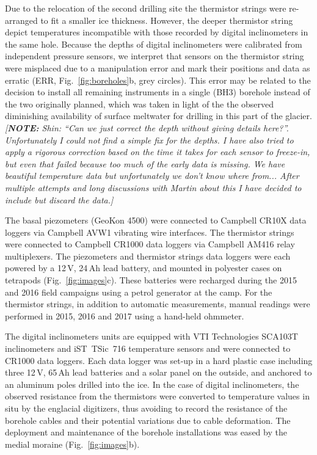 \documentclass[utf8]{article}
\newcommand{\note}[1]{\textcolor{c0}{\emph{[\textbf{NOTE:} #1]}}}
\begin{document}
    Due to the relocation of the second drilling site the thermistor strings
    were re-arranged to fit a smaller ice thickness. However, the deeper
    thermistor string depict temperatures incompatible with those recorded by
    digital inclinometers in the same hole. Because the depths of digital
    inclinometers were calibrated from independent pressure sensors, we
    interpret that sensors on the thermistor string were misplaced due to a
    manipulation error and mark their positions and data as erratic (ERR,
    Fig.~\ref{fig:boreholes}b, grey circles). This error may be related to the
    decision to install all remaining instruments in a single (BH3) borehole
    instead of the two originally planned, which was taken in light of the
    the observed diminishing availability of surface meltwater for drilling in
    this part of the glacier.
    \note{Shin: ``Can we just correct the depth without giving details here?''.
          Unfortunately I could not find a simple fix for the depths. I have
          also tried to apply a rigorous correction based on the time it takes
          for each sensor to freeze-in, but even that failed because too much
          of the early data is missing. We have beautiful temperature data but
          unfortunately we don't know where from... After multiple attempts
          and long discussions with Martin about this I have decided to include
          but discard the data.}

    The basal piezometers (GeoKon 4500) were connected to Campbell CR10X data
    loggers via Campbell AVW1 vibrating wire interfaces. The thermistor strings
    \citep[NTC~Fenwal 135-103FAG-J01,][]{Ryser.2014} were connected to Campbell
    CR1000 data loggers via Campbell AM416 relay multiplexers. The piezometers
    and thermistor strings data loggers were each powered by a 12\,V, 24\,Ah
    lead battery, and mounted in polyester cases on tetrapods
    (Fig.~\ref{fig:images}c). These batteries were recharged during the 2015
    and 2016 field campaigns using
    a petrol generator at the camp. For the thermistor strings, in addition to
    automatic measurements, manual readings were performed in 2015, 2016 and
    2017 using a hand-held ohmmeter.

    The digital inclinometers units \citep[DIBOSS,][]{Ryser.2014,
    Ryser.etal.2014, Ryser.etal.2014a} are equipped with VTI Technologies
    SCA103T inclinometers and iST~TSic~716 temperature sensors and
    were connected to CR1000 data loggers. Each data logger
    was set-up in a hard plastic case including three 12\,V, 65\,Ah lead
    batteries and a solar panel on the outside, and anchored to an aluminum
    poles drilled into the ice.
    In the case of digital inclinometers, the observed resistance from the
    thermistors were converted to temperature values in situ by the englacial
    digitizers, thus avoiding to record the resistance of the borehole cables
    and their potential variations due to cable deformation. The deployment and
    maintenance of the borehole installations was eased by the medial moraine
    (Fig.~\ref{fig:images}b).
\end{document}
